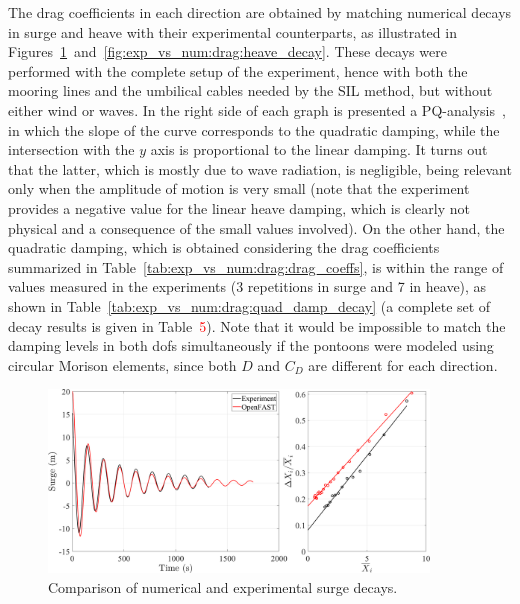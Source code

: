 The drag coefficients in each direction are obtained by matching numerical decays in surge and heave with their experimental counterparts, as illustrated in Figures~\ref{fig:exp_vs_num:drag:surge_decay}~and~\ref{fig:exp_vs_num:drag:heave_decay}. These decays were performed with the complete setup of the experiment, hence with both the mooring lines and the umbilical cables needed by the SIL method, but without either wind or waves. In the right side of each graph is presented a PQ-analysis~\citep{burmester2020}, in which the slope of the curve corresponds to the quadratic damping, while the intersection with the $y$ axis is proportional to the linear damping. It turns out that the latter, which is mostly due to wave radiation, is negligible, being relevant only when the amplitude of motion is very small (note that the experiment provides a negative value for the linear heave damping, which is clearly not physical and a consequence of the small values involved). On the other hand, the quadratic damping, which is obtained considering the drag coefficients summarized in Table~\ref{tab:exp_vs_num:drag:drag_coeffs}, is within the range of values measured in the experiments (3 repetitions in surge and 7 in heave), as shown in Table~\ref{tab:exp_vs_num:drag:quad_damp_decay} (a complete set of decay results is given in Table~\textcolor{red}{5}). Note that it would be impossible to match the damping levels in both dofs simultaneously if the pontoons were modeled using circular Morison elements, since both $D$ and $C_D$ are different for each direction. 
\begin{figure}[!hbtp]
	\centering
	\includegraphics[width=0.9\textwidth]{./figures/surge_decay_drag_pontoon.png}%
	\caption{Comparison of numerical and experimental surge decays.} \label{fig:exp_vs_num:drag:surge_decay}%
\end{figure}%

